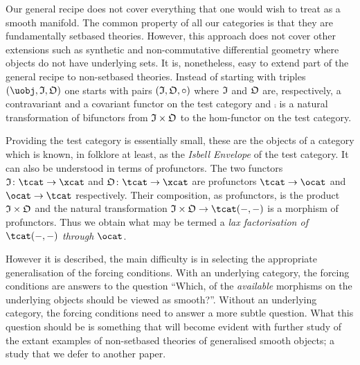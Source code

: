 \documentclass[%
12pt,%
arxiv,%
defaults
]{myclass}
\begin{document}
Our general recipe does not cover everything that one would wish to treat as a smooth manifold.
The common property of all our categories is that they are fundamentally set\enhyp{}based theories.
However, this approach does not cover other extensions such as synthetic and non\hyp{}commutative differential geometry where objects  do not have underlying sets.
It is, nonetheless, easy to extend part of the general recipe to non\hyp{}set\enhyp{}based theories.
Instead of starting with triples \((\uobj, \itest, \otest)\) one  starts with pairs \((\itest, \otest, \comp)\) where \(\itest\) and \(\otest\) are, respectively, a contravariant and a covariant functor on the test category and \(\comp\) is a natural transformation of bifunctors from \(\itest \times \otest\) to the hom\hyp{}functor on the test category.

Providing the test category is essentially small, these are the objects of a category which is known, in folklore at least, as the \emph{Isbell Envelope} of the test category.
It can also be understood in terms of profunctors.
The two functors \(\itest \colon \tcat \to \xcat\) and \(\otest \colon \tcat \to \xcat\) are profunctors \(\tcat \to \ocat\) and \(\ocat \to \tcat\) respectively.
Their composition, as profunctors, is the product \(\itest \times \otest\) and the natural transformation \(\itest \times \otest \to \Hom{\tcat}{-}{-}\) is a morphism of profunctors.
Thus we obtain what may be termed a \emph{lax factorisation of \(\Hom{\tcat}{-}{-}\) through \(\ocat\)}.

However it is described, the main difficulty is in selecting the appropriate generalisation of the forcing conditions.
With an underlying category, the forcing conditions are answers to the question ``Which, of the \emph{available} morphisms on the underlying objects should be viewed as smooth?''.
Without an underlying category, the forcing conditions need to answer a more subtle question.
What this question should be is something that will become evident with further study of the extant examples of non\hyp{}set\enhyp{}based theories of generalised smooth objects; a study that we defer to another paper.



\end{document}
